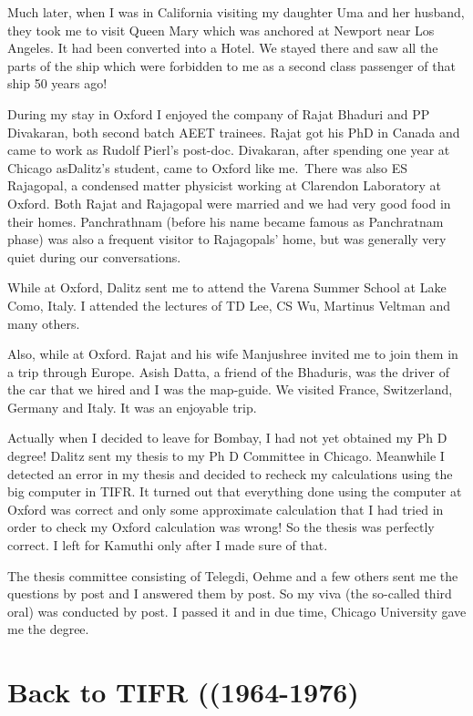 Much later, when I was in California visiting my daughter Uma and her 
husband, they took me to visit Queen Mary which was anchored at Newport 
near Los Angeles. It had been converted into a Hotel. We stayed there 
and saw all the parts of the ship which were forbidden to me as a second 
class passenger of that ship 50 years ago!

During my stay in Oxford I enjoyed the company of Rajat Bhaduri and PP 
Divakaran, both second batch AEET trainees. Rajat got his PhD in Canada 
and came to work as Rudolf Pierl's post-doc. Divakaran, after spending 
one year at Chicago as\break Dalitz's student, came to Oxford like me.\ There 
was also ES Raja\-gopal, a condensed matter physicist working at Clarendon 
Laboratory at Oxford. Both Rajat and Rajagopal were married and we had 
very good food in their homes. Panchrathnam (before his name became 
famous as Panchratnam phase) was also a frequent visitor to Rajagopals' 
home, but was generally very quiet during our conversations.

While at Oxford, Dalitz sent me to attend the Varena Summer School at 
Lake Como, Italy. I attended the lectures of TD Lee, CS Wu, Martinus 
Veltman and many others.

Also, while at Oxford. Rajat and his wife Manjushree invited me to join 
them in a trip through Europe. Asish Datta, a friend of the Bhaduris, 
was the driver of the car that we hired and I was the map-guide. We 
visited France, Switzerland, Germany and Italy. It was an enjoyable 
trip.
 
Actually when I decided to leave for Bombay, I had not yet obtained my 
Ph D degree! Dalitz sent my thesis to my Ph D Committee in Chicago. 
Meanwhile I detected an error in my thesis and decided to recheck my 
calculations using the big computer in TIFR. It turned out that 
everything done using the computer at Oxford was correct and only some 
approximate calculation that I had tried in order to check my Oxford 
calculation was wrong! So the thesis was perfectly correct. I left for 
Kamuthi only after I made sure of that.

The thesis committee consisting of Telegdi, Oehme and a few others sent 
me the questions by post and I answered them by post. So my viva (the 
so-called third oral) was conducted by post. I passed it and in due 
time, Chicago University gave me the degree.

\section*{Back to TIFR ((1964-1976)}

